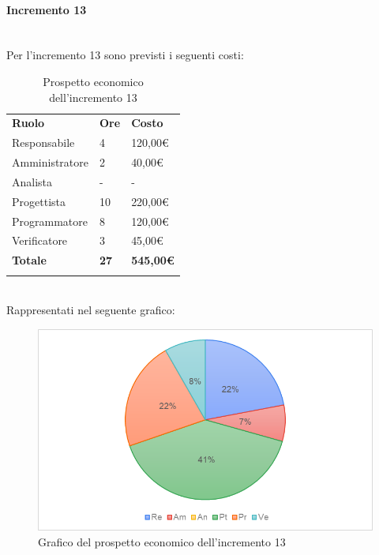 \paragraph{Incremento 13} \mbox{} \\
Per l'incremento 13 sono previsti i seguenti costi:
\begin{longtable} {
		>{}p{32mm}
		>{}p{20mm}
		>{}p{20mm}
	}
	\rowcolor{gray!50}
	
	\textbf{Ruolo} & \textbf{Ore} & \textbf{Costo} \TBstrut \\
	Responsabile & 4 & 120,00\euro{} \TBstrut \\
	Amministratore & 2 & 40,00\euro{} \TBstrut \\
	Analista & - & - \TBstrut \\
	Progettista & 10 & 220,00\euro{}\TBstrut \\
	Programmatore & 8 & 120,00\euro{} \TBstrut \\
	Verificatore & 3 & 45,00\euro{} \TBstrut \\
	\textbf{Totale} & \textbf{27}& \textbf{545,00\euro{}} \TBstrut \\	
	\rowcolor{white}
	\caption{Prospetto economico dell'incremento 13}
\end{longtable} \mbox{} \\
Rappresentati nel seguente grafico: 
\begin{figure} [h!]
	\includegraphics[width=\linewidth]{./img/Grafici/26.png}
	\caption{Grafico del prospetto economico dell'incremento 13}
\end{figure}
